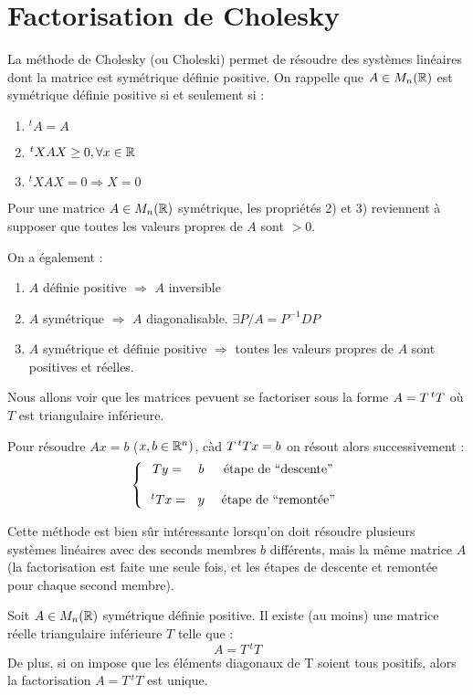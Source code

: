 \chapter{Factorisation de Cholesky}

La méthode de Cholesky (ou Choleski) permet de résoudre des systèmes linéaires
dont la matrice est symétrique définie positive. On rappelle que
$A \in M_n(\mathbb{R})$ est symétrique définie positive si et seulement si :
\begin{enumerate}
    \item $^tA = A$
    \item $^tXAX \geq 0, \forall x \in \mathbb{R}$
    \item $^tXAX = 0 \Rightarrow X = 0$
\end{enumerate}
Pour une matrice $A \in M_n(\mathbb{R})$ symétrique, les propriétés 2) et 3) reviennent à supposer que toutes les valeurs propres de $A$ sont $> 0$.

On a également :
\begin{enumerate}
    \item $A$ définie positive $\Rightarrow$ $A$ inversible
    \item $A$ symétrique $\Rightarrow$ $A$ diagonalisable. $\exists P / A = P^{-1}DP$
    \item $A$ symétrique et définie positive $\Rightarrow$ toutes les valeurs propres de $A$ sont positives et réelles.
\end{enumerate}

Nous allons voir que les matrices pevuent se factoriser sous la forme $A = T\,^tT$ où
$T$ est triangulaire inférieure.

Pour résoudre $Ax = b$ ($x,b \in \mathbb{R}^n)$, càd $T\,^tTx=b$ on résout alors successivement :
\begin{equation*}
\left\lbrace
    \begin{array}{ccc}
        Ty  = & b & \text{ étape de ``descente''}\\
        \\
        \,^tTx  = & y & \text{ étape de ``remontée''}
    \end{array}
\right.
\end{equation*}

Cette méthode est bien sûr intéressante lorsqu'on doit résoudre plusieurs systèmes linéaires
avec des seconds membres $b$ différents, mais la même matrice $A$ (la factorisation est faite
une seule fois, et les étapes de descente et remontée pour chaque second membre).


\begin{ftheo}
    Soit $A \in M_n(\mathbb{R})$ symétrique définie positive. Il existe (au moins) une matrice réelle triangulaire inférieure $T$ telle que :
    \[
        A = T \,^tT
    \]
    De plus, si on impose que les éléments diagonaux de T soient tous positifs, alors la factorisation $A = T \,^tT$ est unique.
\end{ftheo}


